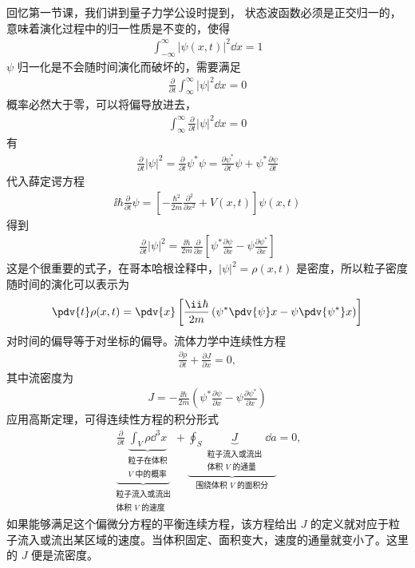 回忆第一节课，我们讲到量子力学公设时提到，
状态波函数必须是正交归一的，意味着演化过程中的归一性质是不变的，使得
\begin{eqnarray}
    \int_{-\infty}^\infty |\psi(x,t)|^2 \dd x = 1
\end{eqnarray}
$\psi$ 归一化是不会随时间演化而破坏的，需要满足
\begin{eqnarray}
    \frac{\partial}{\partial t} \int_{\infty}^\infty |\psi|^2 \dd x = 0
\end{eqnarray}
概率必然大于零，可以将偏导放进去，
\begin{eqnarray}
    \int_{\infty}^\infty \frac{\partial}{\partial t}  |\psi|^2 \dd x = 0
\end{eqnarray}
有
\begin{eqnarray}
    \frac{\partial}{\partial t} |\psi|^2 = \frac{\partial}{\partial t} \psi^* \psi = \frac{\partial \psi^*}{\partial t}\psi + \psi^* \frac{\partial \psi}{\partial t}
\end{eqnarray}
代入薛定谔方程
\begin{eqnarray}
    \ii\hbar \frac{\partial}{\partial t} \psi = \left[
        -\frac{\hbar^2}{2m} \frac{\partial^2}{\partial x^2} + V(x,t)
    \right]
    \psi(x,t)
\end{eqnarray}
得到
\begin{eqnarray}
    \frac{\partial}{\partial t} |\psi|^2 = \frac{\ii\hbar}{2m} \frac{\partial}{\partial x}
    \left[
        \psi^* \frac{\partial \psi}{\partial x} - \psi \frac{\partial \psi^*}{\partial x}
    \right]
\end{eqnarray}
这是个很重要的式子，在哥本哈根诠释中，$|\psi|^2 = \rho(x,t)$ 是密度，所以粒子密度随时间的演化可以表示为
\begin{eqnarray}
    \pdv{t} \rho(x,t) = \pdv{x} \left[
        \frac{\ii\hbar}{2m} \left(
            \psi^* \pdv{\psi}x - \psi\pdv{\psi^*}x
        \right)
    \right]
\end{eqnarray}
对时间的偏导等于对坐标的偏导。流体力学中连续性方程
\begin{eqnarray}
    \frac{\partial \rho}{\partial t} + \frac{\partial J}{\partial x} = 0, 
\end{eqnarray}
其中流密度为
\begin{eqnarray}
    J = -\frac{\ii\hbar}{2m} \left( \psi^* \frac{\partial \psi}{\partial x} - \psi \frac{\partial \psi^*}{\partial x}\right)
\end{eqnarray}
应用高斯定理，可得连续性方程的积分形式
\begin{eqnarray}
    \underbrace{\frac{\partial}{\partial t} \underbrace{\int_V \rho \dd^3x}_{\substack{\text{粒子在体积} \\ \text{$V$ 中的概率}}} }_{\substack{\text{粒子流入或流出}\\ \text{体积 $V$ 的速度}}} 
     + 
    \underbrace{\oint_S \underbrace{J}_{\substack{\text{粒子流入或流出}\\ \text{体积 $V$ 的通量}}} \dd a}_{\text{围绕体积 $V$ 的面积分}} = 0,
\end{eqnarray}
如果能够满足这个偏微分方程的平衡连续方程，该方程给出 $J$ 的定义就对应于粒子流入或流出某区域的速度。当体积固定、面积变大，速度的通量就变小了。这里的 $J$ 便是流密度。

